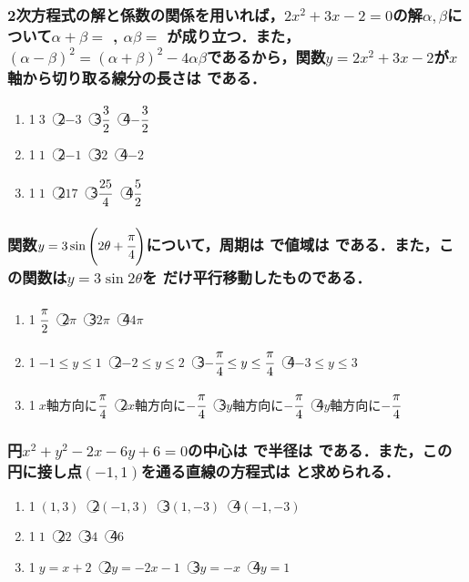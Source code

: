 \documentclass[onecolumn,10pt]{jarticle}
\newcommand{\ctext}[1]{\textcircled{\scriptsize #1}}
\begin{document}
\subsubsection{2次方程式の解と係数の関係を用いれば，$2x^2+3x-2=0$の解$\alpha,\beta$について$\alpha+\beta=$  , $\alpha\beta=$  が成り立つ．また，$(\alpha-\beta)^2=(\alpha+\beta)^2-4\alpha\beta$であるから，関数$y=2x^2+3x-2$が$x$軸から切り取る線分の長さは  である．}
\begin{enumerate}[(1)]
    \item \ctext{1}$3$　\ctext{2}$-3$　\ctext{3}$\cfrac{3}{2}$　\ctext{4}$-\cfrac{3}{2}$
    \item \ctext{1}$1$　\ctext{2}$-1$　\ctext{3}$2$　\ctext{4}$-2$
    \item \ctext{1}$1$　\ctext{2}$17$　\ctext{3}$\cfrac{25}{4}$　\ctext{4}$\cfrac{5}{2}$
\end{enumerate}

\subsubsection{関数$y=3\sin\left(2\theta+\cfrac{\pi}{4}\right)$について，周期は  で値域は  である．また，この関数は$y=3\sin2\theta$を  だけ平行移動したものである．}
\begin{enumerate}[(1)]
    \item \ctext{1}$\cfrac{\pi}{2}$　\ctext{2}$\pi$　\ctext{3}$2\pi$　\ctext{4}$4\pi$
    \item \ctext{1}$-1\leq y\leq 1$　\ctext{2}$-2\leq y\leq 2$　\ctext{3}$-\cfrac{\pi}{4}\leq y\leq \cfrac{\pi}{4}$　\ctext{4}$-3\leq y\leq 3$
    \item \ctext{1}$x$軸方向に$\cfrac{\pi}{4}$　\ctext{2}$x$軸方向に$-\cfrac{\pi}{4}$　\ctext{3}$y$軸方向に$-\cfrac{\pi}{4}$　\ctext{4}$y$軸方向に$-\cfrac{\pi}{4}$
\end{enumerate}

\subsubsection{円$x^2+y^2-2x-6y+6=0$の中心は  で半径は  である．また，この円に接し点$(-1,1)$を通る直線の方程式は  と求められる．}
\begin{enumerate}[(1)]
    \item \ctext{1}$(1,3)$　\ctext{2}$(-1,3)$　\ctext{3}$(1,-3)$　\ctext{4}$(-1,-3)$
    \item \ctext{1}$1$　\ctext{2}$2$　\ctext{3}$4$　\ctext{4}$6$
    \item \ctext{1}$y=x+2$　\ctext{2}$y=-2x-1$　\ctext{3}$y=-x$　\ctext{4}$y=1$
\end{enumerate}
\end{document}
